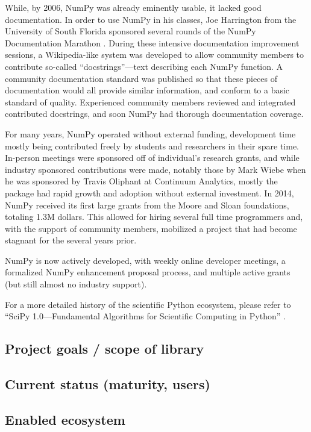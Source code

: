 \documentclass[fleqn,10pt]{wlscirep}
\begin{document}
While, by 2006, NumPy was already eminently usable, it lacked good
documentation. In order to use NumPy in his classes, Joe Harrington
from the University of South Florida sponsored several rounds of the
NumPy Documentation Marathon \cite{harrington2008scipy,vanderwalt2008scipy}.
During these intensive
documentation improvement sessions, a Wikipedia-like system was
developed to allow community members to contribute so-called
``docstrings''—text describing each NumPy function. A community
documentation standard was published so that these pieces of
documentation would all provide similar information, and conform to a
basic standard of quality. Experienced community members reviewed and
integrated contributed docstrings, and soon NumPy had thorough
documentation coverage.

For many years, NumPy operated without external funding, development
time mostly being contributed freely by students and researchers in
their spare time.  In-person meetings were sponsored off of
individual's research grants, and while industry sponsored
contributions were made, notably those by Mark Wiebe when he was
sponsored by Travis Oliphant at Continuum Analytics, mostly the package had rapid growth
and adoption without external investment.  In 2014, NumPy received its
first large grants from the Moore and Sloan foundations, totaling 1.3M
dollars.  This allowed for hiring several full time programmers and,
with the support of community members, mobilized a project that had
become stagnant for the several years prior.

NumPy is now actively developed, with weekly online developer
meetings, a formalized NumPy enhancement proposal process, and
multiple active grants (but still almost no industry support).

For a more detailed history of the scientific Python ecosystem, please
refer to ``SciPy 1.0---Fundamental Algorithms for Scientific Computing
in Python'' \cite{virtanen2019scipy}.

\subsection*{Project goals / scope of library}

\subsection*{Current status (maturity, users)}

\subsection*{Enabled ecosystem }
\end{document}
